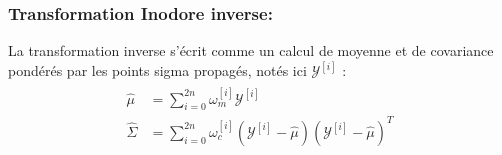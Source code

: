 \subsubsection{Transformation Inodore inverse:}
La transformation inverse s'écrit comme un calcul de moyenne et de covariance pondérés par les points sigma propagés, notés ici $\mathcal{Y}^{[i]}$ :
\begin{align} \label{eq:ch4_transformation_inodore_inverse}
	\begin{split}
		\hat{\mu} &= \sum\limits_{i=0}^{2n} \omega_m^{[i]} \mathcal{Y}^{[i]} \\
		\hat{\Sigma} &= \sum\limits_{i=0}^{2n} \omega_c^{[i]} \left( \mathcal{Y}^{[i]} - \hat{\mu} \right) \left( \mathcal{Y}^{[i]} - \hat{\mu} \right)^T
	\end{split}
\end{align}

